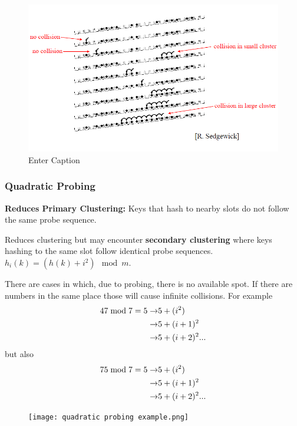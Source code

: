 \begin{figure}[H]
    \centering
    \includegraphics[width=0.75\linewidth]{primary clustering.png}
    \caption{Enter Caption}
    \label{fig:enter-label}
\end{figure}

\subsubsection{Quadratic Probing}
\textbf{Reduces Primary Clustering:} Keys that hash to nearby slots do not follow the same probe sequence.

Reduces clustering but may encounter \textbf{secondary clustering} where keys hashing to the same slot follow identical probe sequences. \( h_i(k) = (h(k) + i^2) \mod m \).

There are cases in which, due to probing, there is no available spot. If there are numbers in the same place those will cause infinite collisions. For example
\begin{align}
47 \hspace{1mm} \text{mod} \hspace{1mm} 7 =  5 \rightarrow & 5+(i^2) \\
                                               \rightarrow & 5+(i+1)^2 \\
                                               \rightarrow & 5+(i+2)^2 ...    
\end{align}
but also
\begin{align}
75 \hspace{1mm} \text{mod} \hspace{1mm} 7 =  5 \rightarrow & 5+(i^2) \\
                                               \rightarrow & 5+(i+1)^2 \\
                                               \rightarrow & 5+(i+2)^2 ...    
\end{align}
\begin{figure}[h!]
    \centering
    \texttt{[image: quadratic probing example.png]}
    \label{fig:enter-label}
\end{figure}

